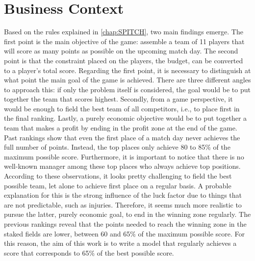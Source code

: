 \section{Business Context}

Based on the rules explained in \autoref{chap:SPITCH}, two main findings emerge. The first point is the main objective of the game: assemble a team of 11 players that will score as many points as possible on the upcoming match day. The second point is that the constraint placed on the players, the budget, can be converted to a player's total score. Regarding the first point, it is necessary to distinguish at what point the main goal of the game is achieved. There are three different angles to approach this: if only the problem itself is considered, the goal would be to put together the team that scores highest. Secondly, from a game perspective, it would be enough to field the best team of all competitors, i.e., to place first in the final ranking. Lastly, a purely economic objective would be to put together a team that makes a profit by ending in the profit zone at the end of the game. Past rankings show that even the first place of a match day never achieves the full number of points. Instead, the top places only achieve 80 to 85\% of the maximum possible score. Furthermore, it is important to notice that there is no well-known manager among these top places who always achieve top positions. According to these observations, it looks pretty challenging to field the best possible team, let alone to achieve first place on a regular basis. A probable explanation for this is the strong influence of the luck factor due to things that are not predictable, such as injuries. Therefore, it seems much more realistic to pursue the latter, purely economic goal, to end in the winning zone regularly. The previous rankings reveal that the points needed to reach the winning zone in the staked fields are lower, between 60 and 65\% of the maximum possible score. For this reason, the aim of this work is to write a model that regularly achieves a score that corresponds to 65\% of the best possible score.


